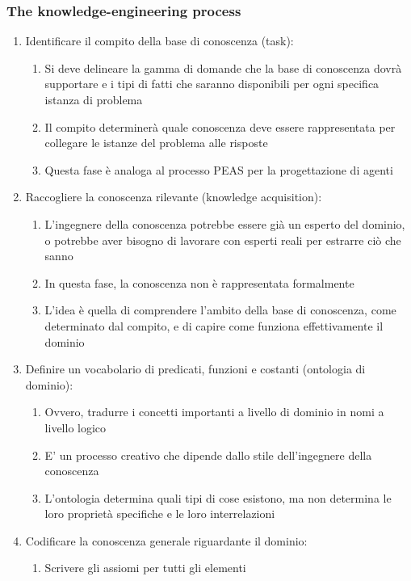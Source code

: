 \documentclass[../main.tex]{subfiles}
\begin{document}
	\subsubsection{The knowledge-engineering process}
	\begin{enumerate}
		\item Identificare il compito della base di conoscenza (task): 
		\begin{enumerate}
			\item Si deve delineare la gamma di domande che la base di conoscenza dovrà supportare e i tipi di fatti che saranno disponibili per ogni specifica istanza di problema
			\item Il compito determinerà quale conoscenza deve essere rappresentata per collegare le istanze del problema alle risposte
			\item Questa fase è analoga al processo PEAS per la progettazione di agenti
		\end{enumerate}
		\item Raccogliere la conoscenza rilevante (knowledge acquisition): 
		\begin{enumerate}
			\item L'ingegnere della conoscenza potrebbe essere già un esperto del dominio, o potrebbe aver bisogno di lavorare con esperti reali per estrarre ciò che sanno
			\item In questa fase, la conoscenza non è rappresentata formalmente
			\item L'idea è quella di comprendere l'ambito della base di conoscenza, come determinato dal compito, e di capire come funziona effettivamente il dominio
		\end{enumerate}
		\item Definire un vocabolario di predicati, funzioni e costanti (ontologia di dominio): 
		\begin{enumerate}
			\item Ovvero, tradurre i concetti importanti a livello di dominio in nomi a livello logico
			\item E' un processo creativo che dipende dallo stile dell'ingegnere della conoscenza
			\item L'ontologia determina quali tipi di cose esistono, ma non determina le loro proprietà specifiche e le loro interrelazioni
		\end{enumerate}
		\item Codificare la conoscenza generale riguardante il dominio: 
		\begin{enumerate}
			\item Scrivere gli assiomi per tutti gli elementi

\end{enumerate}
\end{enumerate}
\end{document}
